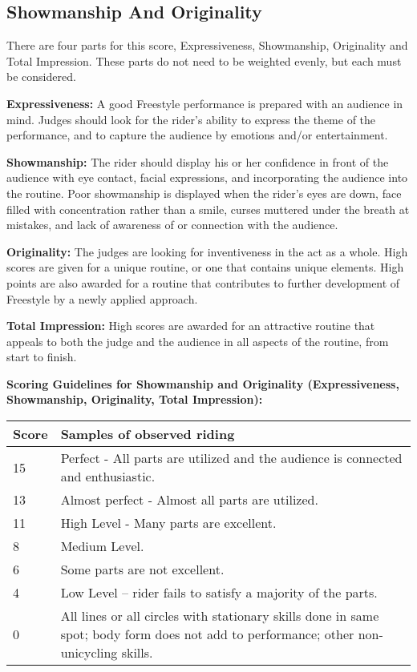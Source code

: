 \subsection{Showmanship And Originality}
There are four parts for this score, Expressiveness, Showmanship, Originality and Total Impression.
These parts do not need to be weighted evenly, but each must be considered.

\textbf{Expressiveness:} A good Freestyle performance is prepared with an audience in mind.
Judges should look for the rider's ability to express the theme of the performance, and to capture the audience by emotions and/or entertainment.

\textbf{Showmanship:} The rider should display his or her confidence in front of the audience with eye contact, facial expressions, and incorporating the audience into the routine.
Poor showmanship is displayed when the rider's eyes are down, face filled with concentration rather than a smile, curses muttered under the breath at mistakes, and lack of awareness of or connection with the audience.

\textbf{Originality:} The judges are looking for inventiveness in the act as a whole.
High scores are given for a unique routine, or one that contains unique elements.
High points are also awarded for a routine that contributes to further development of Freestyle by a newly applied approach.

\textbf{Total Impression:} High scores are awarded for an attractive routine that appeals to both the judge and the audience in all aspects of the routine, from start to finish.

\textbf{Scoring Guidelines for Showmanship and Originality (Expressiveness, Showmanship, Originality, Total Impression):}

\begin{tabular}{|l|p{12.5cm}|}
\hline
\textbf{Score} & \textbf{Samples of observed riding} \\
\hline
15 & Perfect - All parts are utilized and the audience is connected and enthusiastic. \\
\hline
13 & Almost perfect - Almost all parts are utilized. \\
\hline
11 & High Level - Many parts are excellent. \\
\hline
8 & Medium Level. \\
\hline
6 & Some parts are not excellent. \\
\hline
4 & Low Level – rider fails to satisfy a majority of the parts. \\
\hline
0 & All lines or all circles with stationary skills done in same spot; body form does not add to performance; other non-unicycling skills. \\
\hline
\end{tabular}

